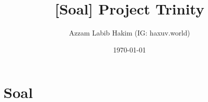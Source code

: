 

\title{[Soal] Project Trinity}
\author{Azzam Labib Hakim (IG: haxuv.world)}
\date{\today}



\maketitle

\renewcommand*\contentsname{Daftar Isi}
\tableofcontents

\newpage
\section{Soal}



